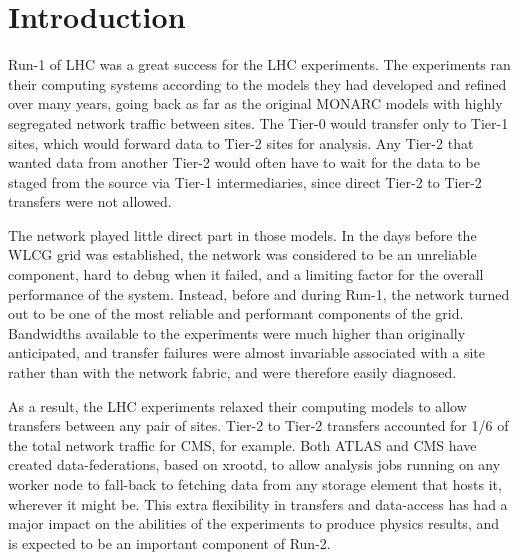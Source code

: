 \section{Introduction}

Run-1 of LHC was a great success for the LHC experiments. The experiments ran their computing systems according to the models they had developed and refined over many years, going back as far as the original MONARC\cite{MONARC} models with highly segregated network traffic between sites. The Tier-0 would transfer only to Tier-1 sites, which would forward data to Tier-2 sites for analysis. Any Tier-2 that wanted data from another Tier-2 would often have to wait for the data to be staged from the source via Tier-1 intermediaries, since direct Tier-2 to Tier-2 transfers were not allowed.

The network played little direct part in those models. In the days before the WLCG grid\cite{WLCG} was established, the network was considered to be an unreliable component, hard to debug when it failed, and a limiting factor for the overall performance of the system. Instead, before and during Run-1, the network turned out to be one of the most reliable and performant components of the grid. Bandwidths available to the experiments were much higher than originally anticipated, and transfer failures were almost invariable associated with a site rather than with the network fabric, and were therefore easily diagnosed.

As a result, the LHC experiments relaxed their computing models to allow transfers between any pair of sites. Tier-2 to Tier-2 transfers accounted for 1/6 of the total network traffic for CMS, for example. Both ATLAS and CMS have created data-federations, based on xrootd\cite{xrootd}, to allow analysis jobs running on any worker node to fall-back to fetching data from any storage element that hosts it, wherever it might be. This extra flexibility in transfers and data-access has had a major impact on the abilities of the experiments to produce physics results, and is expected to be an important component of Run-2.